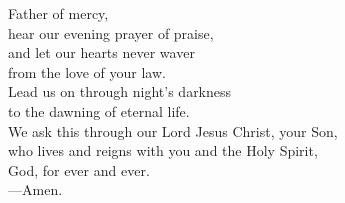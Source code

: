 \prayer


\begin{prayerverse}
Father of mercy,\\
hear our evening prayer of praise,\\
and let our hearts never waver\\
from the love of your law.\\
Lead us on through night’s darkness\\
to the dawning of eternal life.\\
We ask this through our Lord Jesus Christ, your Son,\\
who lives and reigns with you and the Holy Spirit,\\
God, for ever and ever.\\
{\color{red}---\thinspace}Amen.
\end{prayerverse}

